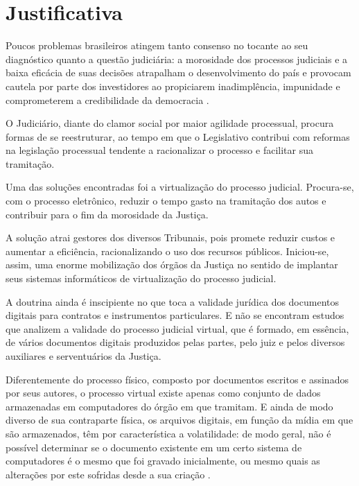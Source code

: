 \chapter{Justificativa}

  Poucos problemas brasileiros atingem tanto consenso no tocante
  ao seu diagnóstico quanto a questão judiciária: a morosidade
  dos processos judiciais e a baixa eficácia de suas decisões
  atrapalham o desenvolvimento do país e provocam cautela por
  parte dos investidores ao propiciarem inadimplência, impunidade
  e comprometerem a credibilidade da democracia
  \cite{RelatorioCNJ2005}.\par

  O Judiciário, diante do clamor social por maior agilidade
  processual, procura formas de se reestruturar, ao tempo em que o
  Legislativo contribui com reformas na legislação processual
  tendente a racionalizar o processo e facilitar sua tramitação.
  \par

  Uma das soluções encontradas foi a virtualização do processo
  judicial. Procura-se, com o processo eletrônico, reduzir o
  tempo gasto na tramitação dos autos e contribuir para o fim da
  morosidade da Justiça.\par

  A solução atrai gestores dos diversos Tribunais, pois promete
  reduzir custos e aumentar a eficiência, racionalizando o uso
  dos recursos públicos. Iniciou-se, assim, uma enorme
  mobilização dos órgãos da Justiça no sentido de implantar seus
  sistemas informáticos de virtualização do processo
  judicial.\par

  A doutrina ainda é inscipiente no que toca a validade jurídica
  dos documentos digitais para contratos e instrumentos
  particulares. E não se encontram estudos que analizem a
  validade do processo judicial virtual, que é formado, em
  essência, de vários documentos digitais produzidos pelas
  partes, pelo juiz e pelos diversos auxiliares e serventuários
  da Justiça.\par

  Diferentemente do processo físico, composto por documentos
  escritos e assinados por seus autores, o processo virtual
  existe apenas como conjunto de dados armazenadas em computadores
  do órgão em que tramitam. E ainda de modo diverso de sua
  contraparte física, os arquivos digitais, em função da mídia
  em que são armazenados, têm por característica a volatilidade:
  de modo geral, não é possível determinar se o documento
  existente em um certo sistema de computadores é o mesmo que foi
  gravado inicialmente, ou mesmo quais as alterações por este
  sofridas desde a sua criação \cite[p.554]{ComputerNetworks}.\par

